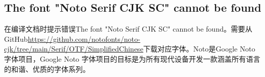 \documentclass[../../../dolphin-book-2023.tex]{subfiles}
\begin{document}
\subsection{The font "Noto Serif CJK SC" cannot be found}

在编译文档时提示错误The font "Noto Serif CJK SC" cannot be found。需要从GitHub\url{https://github.com/notofonts/noto-cjk/tree/main/Serif/OTF/SimplifiedChinese}下载对应字体。Noto是Google Noto 字体项目，Google Noto 字体项目的目标是为所有现代设备开发一款涵盖所有语言的和谐、优质的字体系列。
\end{document}
